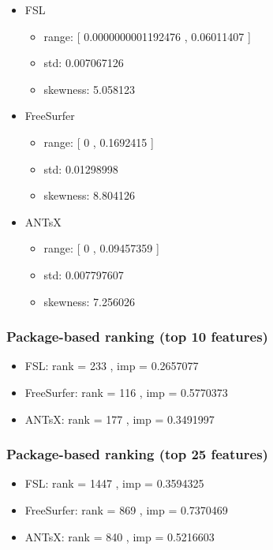 \documentclass[
  10pt,
]{article}
\begin{document}
\begin{itemize}
\item
  FSL

  \begin{itemize}
  \item
    range: {[} 0.0000000001192476 , 0.06011407 {]}
  \item
    std: 0.007067126
  \item
    skewness: 5.058123
  \end{itemize}
\item
  FreeSurfer

  \begin{itemize}
  \item
    range: {[} 0 , 0.1692415 {]}
  \item
    std: 0.01298998
  \item
    skewness: 8.804126
  \end{itemize}
\item
  ANTsX

  \begin{itemize}
  \item
    range: {[} 0 , 0.09457359 {]}
  \item
    std: 0.007797607
  \item
    skewness: 7.256026
  \end{itemize}
\end{itemize}

\hypertarget{package-based-ranking-top-10-features-11}{%
\subsubsection{Package-based ranking (top 10
features)}\label{package-based-ranking-top-10-features-11}}

\begin{itemize}
\item
  FSL: rank = 233 , imp = 0.2657077
\item
  FreeSurfer: rank = 116 , imp = 0.5770373
\item
  ANTsX: rank = 177 , imp = 0.3491997
\end{itemize}

\hypertarget{package-based-ranking-top-25-features-11}{%
\subsubsection{Package-based ranking (top 25
features)}\label{package-based-ranking-top-25-features-11}}

\begin{itemize}
\item
  FSL: rank = 1447 , imp = 0.3594325
\item
  FreeSurfer: rank = 869 , imp = 0.7370469
\item
  ANTsX: rank = 840 , imp = 0.5216603
\end{itemize}
\end{document}

